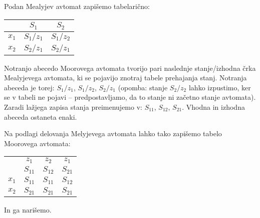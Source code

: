 \begin{resitev}

\bigskip
Podan Mealyjev avtomat zapišemo tabelarično:

\begin{center}
\begin{tabular}{c|cc}
 & $S_1$ & $S_2$\\
\hline
$x_1$ & $S_1/z_1$ & $S_1/z_2$\\
$x_2$ & $S_2/z_1$ & $S_2/z_1$
\end{tabular}
\end{center}

\bigskip
Notranjo abecedo Moorovega avtomata tvorijo pari naslednje stanje/izhodna črka Mealyjevega avtomata, ki se pojavijo znotraj tabele prehajanja stanj. Notranja abeceda je torej: $S_1/z_1$, $S_1/z_2$, $S_2/z_1$ (opomba: stanje $S_2/z_2$ lahko izpustimo, ker se v tabeli ne pojavi -- predpostavljamo, da to stanje ni začetno stanje avtomata). Zaradi lažjega zapisa stanja preimenujemo v: $S_{11}$, $S_{12}$, $S_{21}$. Vhodna in izhodna abeceda ostaneta enaki.

\bigskip
Na podlagi delovanja Melyjevega avtomata lahko tako zapišemo tabelo Moorovega avtomata:

\begin{center}
\begin{tabular}{c|ccc}
 & $z_1$ & $z_2$ & $z_1$\\
 & $S_{11}$ & $S_{12}$ & $S_{21}$\\
\hline
$x_1$ & $S_{11}$ & $S_{11}$ & $S_{12}$\\
$x_2$ & $S_{21}$ & $S_{21}$ & $S_{21}$
\end{tabular}
\end{center}
\bigskip
In ga narišemo.


\end{resitev}
